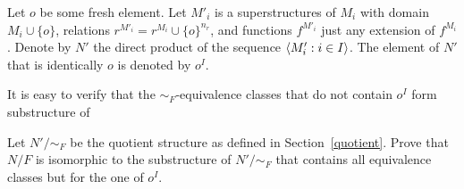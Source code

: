 \documentclass[creche.tex]{subfiles}
\begin{document}
\begin{exercise}\label{ex_o}
Let \emph{$o$\/} be some fresh element. Let \emph{$M'_i$\/} is a superstructures of $M_i$ with domain $M_i\cup\{o\}$, relations $r^{M'_i}=r^{M_i}\cup\{o\}^{n_r}$, and functions $f^{M'_i}$ just any extension of $f^{M_i}$. Denote by $N'$ the direct product of the sequence $\langle M'_i:i\in I\rangle$. The element of $N'$ that is identically $o$ is denoted by $o^I$.
 
It is easy to verify that the $\mathord{\sim_F}$-equivalence classes that do not contain $o^I$ form substructure of 

Let $N'/\mathord{\sim_F}$ be the quotient structure as defined in Section~\ref{quotient}. Prove that $N/F$ is isomorphic to the substructure of $N'/\mathord{\sim_F}$ that contains all equivalence classes but for the one of $o^I$.
\end{exercise}
\end{document}
